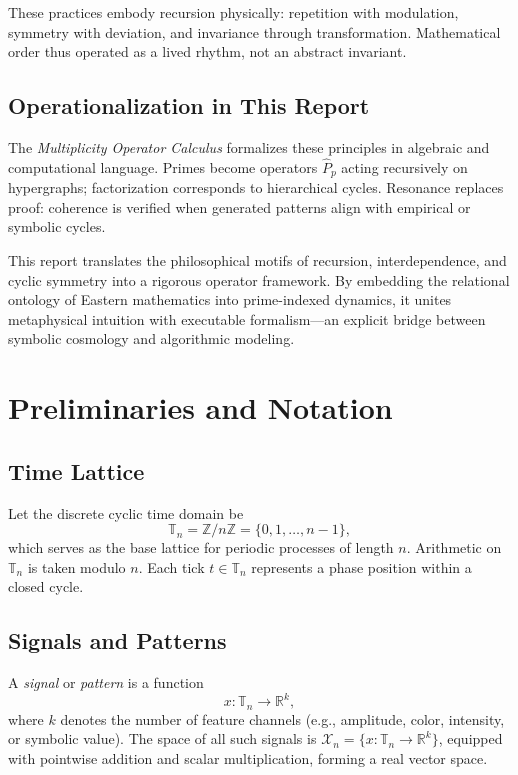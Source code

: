 \documentclass[12pt]{article}
\numberwithin{equation}{section}
\theoremstyle{plain}
\theoremstyle{definition}
\theoremstyle{remark}
\begin{document}
These practices embody recursion physically: repetition with modulation, symmetry with deviation, and invariance through transformation. Mathematical order thus operated as a lived rhythm, not an abstract invariant.

\subsection*{Operationalization in This Report}
The \emph{Multiplicity Operator Calculus} formalizes these principles in algebraic and computational language. Primes become operators \(\hat{P}_{p}\) acting recursively on hypergraphs; factorization corresponds to hierarchical cycles. Resonance replaces proof: coherence is verified when generated patterns align with empirical or symbolic cycles. 

This report translates the philosophical motifs of recursion, interdependence, and cyclic symmetry into a rigorous operator framework. By embedding the relational ontology of Eastern mathematics into prime-indexed dynamics, it unites metaphysical intuition with executable formalism—an explicit bridge between symbolic cosmology and algorithmic modeling.

\section*{Preliminaries and Notation}

\subsection*{Time Lattice}
Let the discrete cyclic time domain be
\[
\mathbb{T}_n = \mathbb{Z}/n\mathbb{Z} = \{0,1,\dots,n-1\},
\]
which serves as the base lattice for periodic processes of length \(n\). Arithmetic on \(\mathbb{T}_n\) is taken modulo \(n\). Each tick \(t\in\mathbb{T}_n\) represents a phase position within a closed cycle.

\subsection*{Signals and Patterns}
A \emph{signal} or \emph{pattern} is a function
\[
x:\mathbb{T}_n \rightarrow \mathbb{R}^k,
\]
where \(k\) denotes the number of feature channels (e.g., amplitude, color, intensity, or symbolic value). The space of all such signals is \(\mathcal{X}_n = \{x:\mathbb{T}_n \to \mathbb{R}^k\}\), equipped with pointwise addition and scalar multiplication, forming a real vector space.
\end{document}
